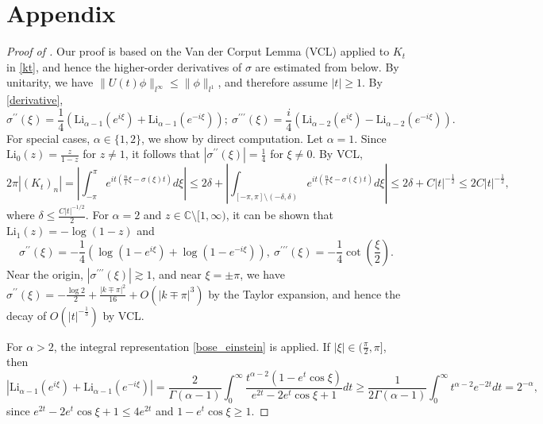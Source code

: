 \documentclass{article}
\numberwithin{equation}{section}
\begin{document}
\section{Appendix}\label{appendix}
\begin{proof}[Proof of ]
Our proof is based on the Van der Corput Lemma (VCL) applied to $K_t$ in \eqref{kt}, and hence the higher-order derivatives of $\sigma$ are estimated from below. By unitarity, we have $\| U(t) \phi \|_{l^\infty} \leq \| \phi \|_{l^1}$, and therefore assume $|t| \geq 1$. By \eqref{derivative},
\begin{equation*}
    \sigma^{\prime\prime}(\xi) = \frac{1}{4}\left(\mathrm{Li}_{\alpha-1}(e^{i\xi}) + \mathrm{Li}_{\alpha-1}(e^{-i\xi})\right);\  \sigma^{\prime\prime\prime}(\xi) = \frac{i}{4}\left(\mathrm{Li}_{\alpha-2}(e^{i\xi}) - \mathrm{Li}_{\alpha-2}(e^{-i\xi})\right).    
\end{equation*}
For special cases, $\alpha \in \{1,2\}$, we show by direct computation. Let $\alpha = 1$. Since $\mathrm{Li}_{0}(z) = \frac{z}{1-z}$ for $z \neq 1$, it follows that $|\sigma^{\prime\prime}(\xi)| = \frac{1}{4}$ for $\xi \neq 0$. By VCL,
\begin{equation*}
    2\pi |(K_t)_n| = \left|\int_{-\pi}^{\pi} e^{it (\frac{n}{t}\xi - \sigma(\xi)t)}d\xi\right| \leq 2\delta + \left|\int_{[-\pi,\pi]\setminus (-\delta,\delta)} e^{it (\frac{n}{t}\xi - \sigma(\xi)t)}d\xi\right| \leq 2\delta + C |t|^{-\frac{1}{2}} \leq 2C |t|^{-\frac{1}{2}},
\end{equation*}
where $\delta \leq \frac{C|t|^{-1/2}}{2}$. For $\alpha = 2$ and $z \in \mathbb{C} \setminus [1,\infty)$, it can be shown that $\mathrm{Li}_1(z) = - \log(1-z)$ and
\begin{equation*}
\sigma^{\prime\prime}(\xi) = -\frac{1}{4} \left(\log(1-e^{i\xi})+\log(1-e^{-i\xi})\right),\ \sigma^{\prime\prime\prime}(\xi) = -\frac{1}{4} \cot(\frac{\xi}{2}).    
\end{equation*}
Near the origin, $|\sigma^{\prime\prime\prime}(\xi)| \gtrsim 1$, and near $\xi = \pm \pi$, we have $\sigma^{\prime\prime}(\xi) = -\frac{\log 2}{2} + \frac{|k \mp \pi|^2}{16} + O(|k \mp \pi|^3)$ by the Taylor expansion, and hence the decay of $O(|t|^{-\frac{1}{3}})$ by VCL.

For $\alpha > 2$, the integral representation \eqref{bose_einstein} is applied. If $|\xi| \in (\frac{\pi}{2},\pi]$, then
\begin{equation*}
|\mathrm{Li}_{\alpha-1}(e^{i\xi})+\mathrm{Li}_{\alpha-1}(e^{-i\xi})| = \frac{2}{\Gamma(\alpha-1)}\int_0^\infty \frac{t^{\alpha-2}(1-e^t \cos \xi)}{e^{2t}-2 e^t \cos \xi + 1}dt\geq \frac{1}{2\Gamma(\alpha-1)}\int_0^\infty t^{\alpha-2}e^{-2t} dt = 2^{-\alpha},
\end{equation*}
since $e^{2t}-2 e^t \cos \xi + 1 \leq 4 e^{2t}$ and $1-e^t \cos \xi \geq 1$.


\end{proof}
\end{document}
